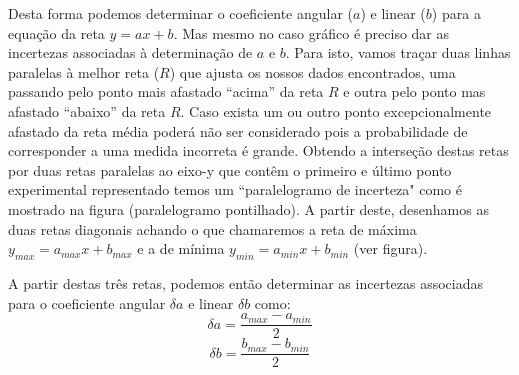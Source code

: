 Desta forma podemos determinar o coeficiente angular ($a$) e linear ($b$) para a equação da reta $y = ax + b$.  Mas mesmo no caso gráfico é preciso dar as incertezas associadas à determinação de $a$ e $b$.  Para isto, vamos traçar duas linhas paralelas à melhor reta ($R$) que ajusta os nossos dados encontrados, uma passando pelo ponto mais afastado ``acima'' da reta $R$ e outra pelo ponto mas afastado ``abaixo'' da reta $R$. %
Caso exista um ou outro ponto excepcionalmente afastado da reta média poderá não ser considerado pois a probabilidade de corresponder a uma medida incorreta é grande. Obtendo a interseção destas retas por duas retas paralelas ao eixo-y que contêm o primeiro e último ponto experimental representado temos um ``paralelogramo de incerteza" como é mostrado na figura (paralelogramo pontilhado). A partir deste, desenhamos as duas retas diagonais achando o que chamaremos a reta de máxima $y_{max} = a_{max} x + b_{max}$ e a de mínima $y_{min} = a_{min} x + b_{min}$ (ver figura).

A partir destas três retas, podemos então determinar as incertezas associadas para o coeficiente angular $\delta a$ e linear $\delta b$ como:
\[
\delta a = \frac{a_{max} - a_{min}}{2} 
\]
\[
\delta b = \frac{b_{max} - b_{min}}{2}
\]


